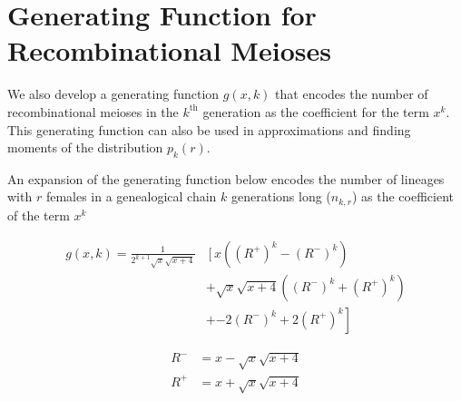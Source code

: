 \documentclass[9pt,twocolumn,twoside]{gsajnl}
\begin{document}
\section*{Generating Function for Recombinational Meioses}
\label{ap:generating-function}

We also develop a generating function $g(x, k)$ that encodes the number of
recombinational meioses in the $k^{\text{th}}$ generation as the coefficient
for the term $x^k$. This generating function can also be used in approximations
and finding moments of the distribution $p_k(r)$.

An expansion of the generating function below encodes the number of lineages
with $r$ females in a genealogical chain $k$ generations long ($n_{k,r}$) as
the coefficient of the term $x^{k}$

\begin{align}
  g(x, k) = \frac{1}{2^{k+1}\sqrt{x} \sqrt{x+4}} &\left[ x \right.
    \left(\left(R^+\right)^k - \left(R^-\right)^k\right) \\ \nonumber
    &+ \sqrt{x} \sqrt{x+4}
    \left(\left(R^-\right)^k + \left(R^+\right)^k\right) \\ \nonumber
    &+ \left. -2 \left(R^-\right)^k+2 \left(R^+\right)^k\right]
\end{align}


\begin{align}
    R^- &= x-\sqrt{x} \sqrt{x+4}\\
    R^+ &= x+\sqrt{x} \sqrt{x+4}
\end{align}
\end{document}
